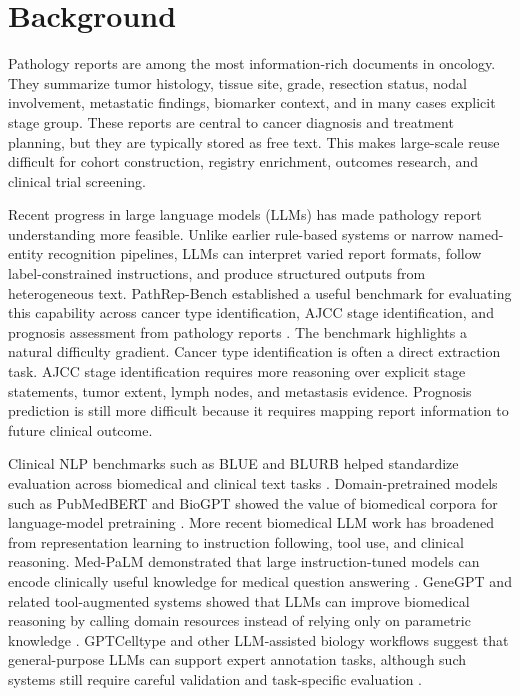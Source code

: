 \documentclass[pdflatex,sn-vancouver-num]{sn-jnl}
\begin{document}

\maketitle

\section{Background}\label{sec:background}

Pathology reports are among the most information-rich documents in oncology. They summarize tumor histology, tissue site, grade, resection status, nodal involvement, metastatic findings, biomarker context, and in many cases explicit stage group. These reports are central to cancer diagnosis and treatment planning, but they are typically stored as free text. This makes large-scale reuse difficult for cohort construction, registry enrichment, outcomes research, and clinical trial screening.

Recent progress in large language models (LLMs) has made pathology report understanding more feasible. Unlike earlier rule-based systems or narrow named-entity recognition pipelines, LLMs can interpret varied report formats, follow label-constrained instructions, and produce structured outputs from heterogeneous text. PathRep-Bench established a useful benchmark for evaluating this capability across cancer type identification, AJCC stage identification, and prognosis assessment from pathology reports \cite{saluja2025pathrep,pathrepbench}. The benchmark highlights a natural difficulty gradient. Cancer type identification is often a direct extraction task. AJCC stage identification requires more reasoning over explicit stage statements, tumor extent, lymph nodes, and metastasis evidence. Prognosis prediction is still more difficult because it requires mapping report information to future clinical outcome.

Clinical NLP benchmarks such as BLUE and BLURB helped standardize evaluation across biomedical and clinical text tasks \cite{peng2019blue,gu2021pubmedbert}. Domain-pretrained models such as PubMedBERT and BioGPT showed the value of biomedical corpora for language-model pretraining \cite{gu2021pubmedbert,luo2022biogpt}. More recent biomedical LLM work has broadened from representation learning to instruction following, tool use, and clinical reasoning. Med-PaLM demonstrated that large instruction-tuned models can encode clinically useful knowledge for medical question answering \cite{singhal2023medpalm}. GeneGPT and related tool-augmented systems showed that LLMs can improve biomedical reasoning by calling domain resources instead of relying only on parametric knowledge \cite{jin2024genegpt}. GPTCelltype and other LLM-assisted biology workflows suggest that general-purpose LLMs can support expert annotation tasks, although such systems still require careful validation and task-specific evaluation \cite{hou2024gptcelltype}.
\end{document}
